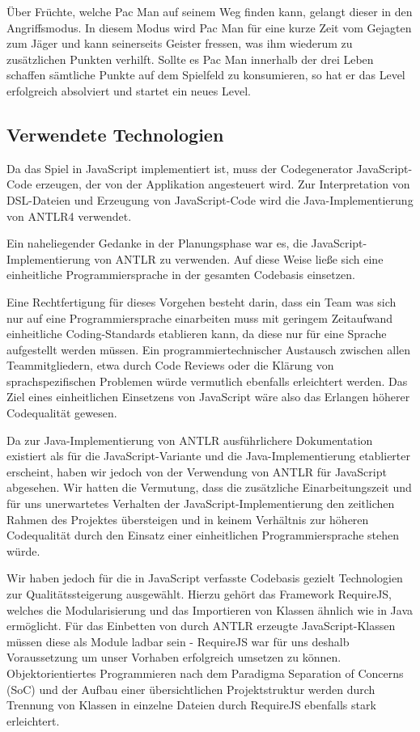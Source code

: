\documentclass[conference]{IEEEtran}
\begin{document}
Über Früchte, welche Pac Man auf seinem Weg finden kann, gelangt dieser in den Angriffsmodus. In diesem Modus wird Pac Man für eine kurze Zeit vom Gejagten zum Jäger und kann seinerseits Geister fressen, was ihm wiederum zu zusätzlichen Punkten verhilft. Sollte es Pac Man innerhalb der drei Leben schaffen sämtliche Punkte auf dem Spielfeld zu konsumieren, so hat er das Level erfolgreich absolviert und startet ein neues Level.



\subsection{Verwendete Technologien}
Da das Spiel in JavaScript implementiert ist, muss der Codegenerator JavaScript-Code erzeugen, der von der Applikation angesteuert wird. Zur Interpretation von DSL-Dateien und Erzeugung von JavaScript-Code wird die Java-Implementierung von ANTLR4 verwendet.

Ein naheliegender Gedanke in der Planungsphase war es, die JavaScript-Implementierung von ANTLR zu verwenden. Auf diese Weise ließe sich eine einheitliche Programmiersprache in der gesamten Codebasis  einsetzen.

Eine Rechtfertigung für dieses Vorgehen besteht darin, dass ein Team was sich nur auf eine Programmiersprache einarbeiten muss mit geringem Zeitaufwand einheitliche Coding-Standards etablieren kann, da diese nur für eine Sprache aufgestellt werden müssen.  Ein programmiertechnischer Austausch zwischen allen Teammitgliedern,  etwa durch Code Reviews oder die Klärung von sprachspezifischen  Problemen würde vermutlich ebenfalls erleichtert werden. Das Ziel eines einheitlichen Einsetzens von JavaScript wäre also das Erlangen höherer Codequalität gewesen.

Da zur Java-Implementierung von ANTLR ausführlichere Dokumentation existiert als für die JavaScript-Variante und die Java-Implementierung etablierter erscheint, haben wir jedoch von der Verwendung von ANTLR für JavaScript abgesehen. Wir hatten die Vermutung, dass die zusätzliche Einarbeitungszeit und für uns unerwartetes Verhalten der JavaScript-Implementierung den zeitlichen Rahmen des Projektes übersteigen und in keinem Verhältnis zur  höheren Codequalität durch den Einsatz einer einheitlichen Programmiersprache stehen würde.

Wir haben jedoch für die in JavaScript verfasste Codebasis gezielt Technologien zur Qualitätssteigerung ausgewählt. Hierzu gehört das Framework RequireJS, welches die Modularisierung und das Importieren von Klassen ähnlich wie in Java ermöglicht. Für das Einbetten von durch ANTLR erzeugte JavaScript-Klassen müssen diese als Module ladbar sein - RequireJS war für uns deshalb Voraussetzung um unser  Vorhaben erfolgreich umsetzen zu können. Objektorientiertes Programmieren nach dem Paradigma Separation of Concerns (SoC) und der Aufbau einer übersichtlichen Projektstruktur werden durch Trennung von Klassen in einzelne Dateien durch RequireJS ebenfalls stark erleichtert.
\end{document}
